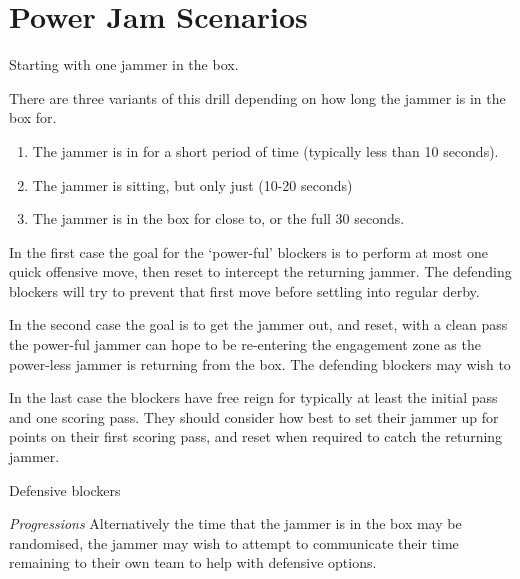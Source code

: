 \section{Power Jam Scenarios}
\label{sec:scenarios/power_jam}

Starting with one jammer in the box. 

There are three variants of this drill depending on how long the jammer is in the box for.

\begin{enumerate}
\item The jammer is in for a short period of time (typically less than 10 seconds).  
\item The jammer is sitting, but only just (10-20 seconds) 
\item The jammer is in the box for close to, or the full 30 seconds. 
\end{enumerate}



In the first case the goal for the `power-ful' blockers is to perform at most one quick offensive move, then reset to intercept the returning jammer. 
The defending blockers will try to prevent that first move before settling into regular derby.   


In the second case the goal is to get the jammer out, and reset, with a clean pass the power-ful jammer can hope to be re-entering the engagement zone as the power-less jammer is returning from the box.
The defending blockers may wish to     



In the last case the blockers have free reign for typically at least the initial pass and one scoring pass.
They should consider how best to set their jammer up for points on their first scoring pass, and reset when required to catch the returning jammer.       


Defensive blockers 

{\it Progressions}
Alternatively the time that the jammer is in the box may be randomised, the jammer may wish to attempt to communicate their time remaining to their own team to help with defensive options. 
